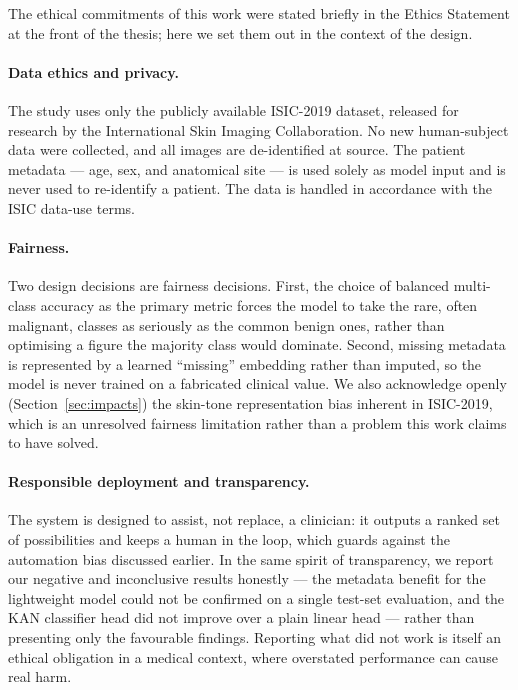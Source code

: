 The ethical commitments of this work were stated briefly in the Ethics
Statement at the front of the thesis; here we set them out in the context of
the design.

\paragraph{Data ethics and privacy.}
The study uses only the publicly available ISIC-2019 dataset, released for
research by the International Skin Imaging Collaboration. No new human-subject
data were collected, and all images are de-identified at source. The patient
metadata --- age, sex, and anatomical site --- is used solely as model input
and is never used to re-identify a patient. The data is handled in accordance
with the ISIC data-use terms.

\paragraph{Fairness.}
Two design decisions are fairness decisions. First, the choice of balanced
multi-class accuracy as the primary metric forces the model to take the rare,
often malignant, classes as seriously as the common benign ones, rather than
optimising a figure the majority class would dominate. Second, missing
metadata is represented by a learned ``missing'' embedding rather than imputed,
so the model is never trained on a fabricated clinical value. We also
acknowledge openly (Section~\ref{sec:impacts}) the skin-tone representation
bias inherent in ISIC-2019, which is an unresolved fairness limitation rather
than a problem this work claims to have solved.

\paragraph{Responsible deployment and transparency.}
The system is designed to assist, not replace, a clinician: it outputs a
ranked set of possibilities and keeps a human in the loop, which guards
against the automation bias discussed earlier. In the same spirit of
transparency, we report our negative and inconclusive results honestly --- the
metadata benefit for the lightweight model could not be confirmed on a single
test-set evaluation, and the KAN classifier head did not improve over a plain
linear head --- rather than presenting only the favourable findings. Reporting
what did not work is itself an ethical obligation in a medical context, where
overstated performance can cause real harm.



